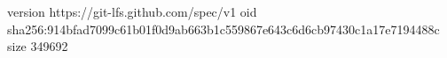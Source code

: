 version https://git-lfs.github.com/spec/v1
oid sha256:914bfad7099c61b01f0d9ab663b1c559867e643c6d6cb97430c1a17e7194488c
size 349692
